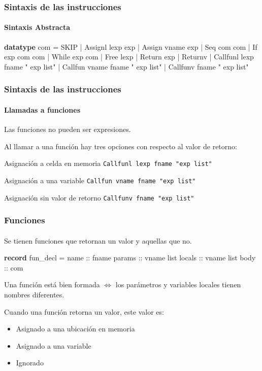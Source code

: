 \begin{frame}[fragile]
\frametitle{Sintaxis de las instrucciones}
\framesubtitle{Sintaxis Abstracta}

\begin{semiverbatim}
\textbf{datatype} com = SKIP
             | Assignl lexp exp
             | Assign  vname exp
             | Seq     com  com
             | If      exp com com
             | While   exp com
             | Free    lexp
             | Return exp
             | Returnv
             | Callfunl lexp fname " exp list"
             | Callfun vname fname " exp list"
             | Callfunv fname " exp list"
\end{semiverbatim}

\end{frame}

\begin{frame}[fragile]
\frametitle{Sintaxis de las instrucciones}
\framesubtitle{Llamadas a funciones}

Las funciones no pueden ser expresiones.
\pause

Al llamar a una función hay tres opciones con respecto al valor de retorno:
\pause
\begin{block}{Asignación a celda en memoria}
\verb|Callfunl lexp fname "exp list"|
\end{block}

\pause

\begin{block}{Asignación a una variable}
\verb|Callfun vname fname "exp list"|
\end{block}

\pause

\begin{block}{Asignación sin valor de retorno}
\verb|Callfunv fname "exp list"|
\end{block}


\end{frame}


\begin{frame}[fragile]
\frametitle{Funciones}
\framesubtitle{}

Se tienen funciones que retornan un valor y aquellas que no.

\begin{semiverbatim}
\textbf{record} fun_decl =
  name :: fname
  params :: vname list
  locals :: vname list
  body :: com
\end{semiverbatim}

\bigskip

Una función está bien formada $\Longleftrightarrow$ los parámetros y variables locales tienen nombres diferentes.

\bigskip

Cuando una función retorna un valor, este valor es:

\begin{itemize}
\item{Asignado a una ubicación en memoria}
\item{Asignado a una variable}
\item{Ignorado}
\end{itemize}


\end{frame}


